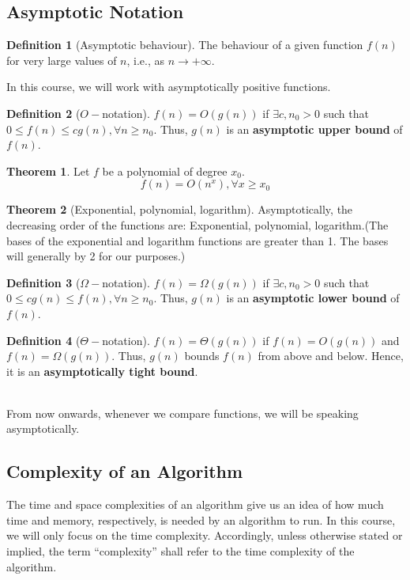 \documentclass[10pt, a4paper]{extarticle}
\theoremstyle{definition}
\newtheorem{thm}{Theorem}
\newtheorem{defn}{Definition}
\begin{document}
\subsection{Asymptotic Notation}
\begin{defn}[Asymptotic behaviour]
	The behaviour of a given function $f(n)$ for very large values of $n$, i.e., as $n\to +\infty$.
\end{defn}
In this course, we will work with asymptotically positive functions.
\begin{defn}[$O-$notation]
	$f(n)=O(g(n))$ if $\exists c,n_0>0$ such that $0\leq f(n)\leq cg(n),\forall n\geq n_0$. Thus, $g(n)$ is an \textbf{asymptotic upper bound} of $f(n)$.
\end{defn}
\begin{thm}
	Let $f$ be a polynomial of degree $x_0$.
	\[f(n)=O(n^x),\forall x\geq x_0\]
\end{thm}
\begin{thm}[Exponential, polynomial, logarithm]
	Asymptotically, the decreasing order of the functions are: Exponential, polynomial, logarithm.(The bases of the exponential and logarithm functions are greater than 1. The bases will generally by 2 for our purposes.)
\end{thm}

\begin{defn}[$\Omega-$notation]
	$f(n)=\Omega(g(n))$ if $\exists c,n_0>0$ such that $0\leq cg(n)\leq f(n),\forall n\geq n_0$. Thus, $g(n)$ is an \textbf{asymptotic lower bound} of $f(n)$.
\end{defn}
\begin{defn}[$\Theta-$notation]
	$f(n)=\Theta(g(n))$ if $f(n)=O(g(n))$ and $f(n)=\Omega(g(n))$. Thus, $g(n)$ bounds $f(n)$ from above and below. Hence, it is an \textbf{asymptotically tight bound}.
\end{defn}
\hfill\\
From now onwards, whenever we compare functions, we will be speaking asymptotically.
\subsection{Complexity of an Algorithm}
The time and space complexities of an algorithm give us an idea of how much time and memory, respectively, is needed by an algorithm to run. In this course, we will only focus on the time complexity. Accordingly, unless otherwise stated or implied, the term “complexity” shall refer to the time complexity of the algorithm.
\end{document}
